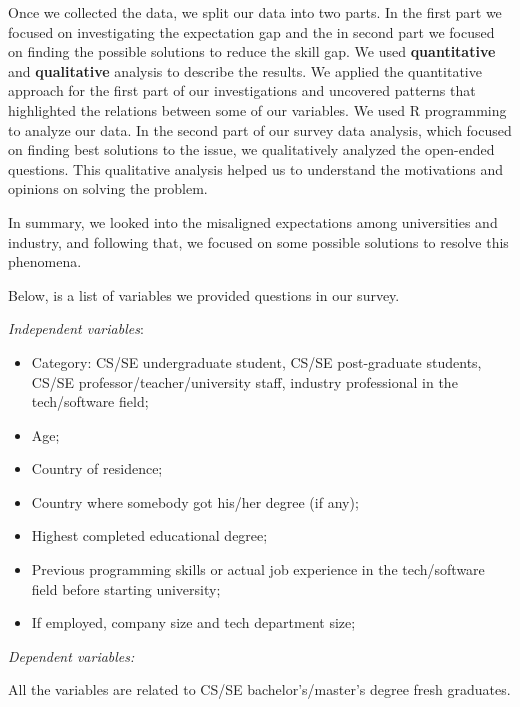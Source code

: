 \documentclass{sigchi}
\begin{document}
 Once we collected the data, we split our data into two parts. In the first part we focused on investigating the expectation gap and the in second part we focused on finding the possible solutions to reduce the skill gap. We used \textbf{quantitative} and \textbf{qualitative} analysis to describe the results. We applied the quantitative approach for the first part of our investigations and uncovered patterns that highlighted the relations between some of our variables. We used R programming to analyze our data. In the second part of our survey data analysis, which focused on finding best solutions to the issue, we qualitatively analyzed the open-ended questions. This qualitative analysis helped us to understand the motivations and opinions on solving the problem. 

In summary, we looked into the misaligned expectations among universities and industry, and following that, we focused on some possible solutions to resolve this phenomena. \newline

Below, is a list of variables we provided questions in our survey.

\textit{Independent variables}:
\begin{itemize}
	\item Category: CS/SE undergraduate student, CS/SE post-graduate students, CS/SE professor/teacher/university staff, industry professional in the tech/software field;
	\item Age;
	\item Country of residence;
	\item Country where somebody got his/her degree (if any);
	\item Highest completed educational degree;
	\item Previous programming skills or actual job experience in the tech/software field before starting university;
	\item If employed, company size and tech department size;
\end{itemize}

\textit{Dependent variables:}

All the variables are related to CS/SE bachelor's/master's degree fresh graduates.
\end{document}
